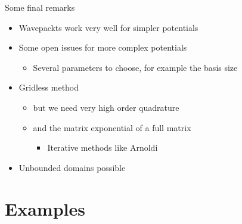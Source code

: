 \documentclass{beamer}
\begin{document}
\begin{frame}{Some final remarks}
  \begin{itemize}
  \item Wavepackts work very well for simpler potentials
  \item Some open issues for more complex potentials
    \begin{itemize}
    \item Several parameters to choose, for example the basis size
    \end{itemize}
  \end{itemize}
  \begin{itemize}
  \item Gridless method
    \begin{itemize}
    \item but we need very high order quadrature
    \item and the matrix exponential of a full matrix
      \begin{itemize}
      \item Iterative methods like Arnoldi
      \end{itemize}
    \end{itemize}
  \end{itemize}
  \begin{itemize}
  \item Unbounded domains possible
  \end{itemize}
\end{frame}


\section{Examples}
\end{document}
